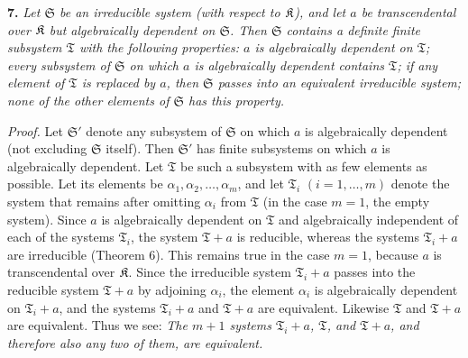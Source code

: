 \textbf{7.} \emph{Let $\mathfrak S$ be an irreducible system (with respect to $\mathfrak K$), and let $a$ be transcendental over $\mathfrak K$ but algebraically dependent on $\mathfrak S$. Then $\mathfrak S$ contains a definite finite subsystem $\mathfrak T$ with the following properties: $a$ is algebraically dependent on $\mathfrak T$; every subsystem of $\mathfrak S$ on which $a$ is algebraically dependent contains $\mathfrak T$; if any element of $\mathfrak T$ is replaced by $a$, then $\mathfrak S$ passes into an equivalent irreducible system; none of the other elements of $\mathfrak S$ has this property.}

\emph{Proof.} Let $\mathfrak S'$ denote any subsystem of $\mathfrak S$ on which $a$ is algebraically dependent (not excluding $\mathfrak S$ itself). Then $\mathfrak S'$ has finite subsystems on which $a$ is algebraically dependent. Let $\mathfrak T$ be such a subsystem with as few elements as possible. Let its elements be $\alpha_1,\alpha_2,\ldots,\alpha_m$, and let $\mathfrak T_i$ $(i=1,\ldots,m)$ denote the system that remains after omitting $\alpha_i$ from $\mathfrak T$ (in the case $m=1$, the empty system). Since $a$ is algebraically dependent on $\mathfrak T$ and algebraically independent of each of the systems $\mathfrak T_i$, the system $\mathfrak T+a$ is reducible, whereas the systems $\mathfrak T_i+a$ are irreducible (Theorem 6). This remains true in the case $m=1$, because $a$ is transcendental over $\mathfrak K$. Since the irreducible system $\mathfrak T_i+a$ passes into the reducible system $\mathfrak T+a$ by adjoining $\alpha_i$, the element $\alpha_i$ is algebraically dependent on $\mathfrak T_i+a$, and the systems $\mathfrak T_i+a$ and $\mathfrak T+a$ are equivalent. Likewise $\mathfrak T$ and $\mathfrak T+a$ are equivalent. Thus we see: \emph{The $m+1$ systems $\mathfrak T_i+a$, $\mathfrak T$, and $\mathfrak T+a$, and therefore also any two of them, are equivalent.}

